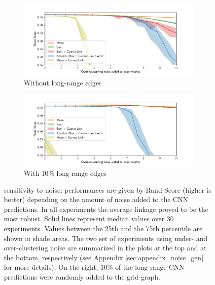 \begin{figure}
        \begin{subfigure}[t]{0.49 \textwidth}
        \centering
        \includegraphics[width=\textwidth,trim=0.55in 0.1in 0.65in 0.2in,clip]{./figs/noise_plots/over_segment_plots_0.pdf}
        \caption{Without long-range edges} \label{fig:merge_noise_only_direct}
    \end{subfigure} \hfill
    \begin{subfigure}[t]{0.49 \textwidth}
        \centering
        \includegraphics[width=\textwidth,trim=0.53in 0.1in 0.65in 0.20in,clip]{./figs/noise_plots/over_segment_plots_1.pdf}
        \caption{With 10\% long-range edges} \label{fig:merge_noise_with_long_range}
    \end{subfigure}
\caption{\algname{} sensitivity to noise: performances are given by Rand-Score (higher is better) depending on the amount of noise added to the CNN predictions. In all experiments the average linkage proved to be the most robust. Solid lines represent median values over 30 experiments. Values between the 25th and the 75th percentile are shown in shade areas. The two set of experiments using under- and over-clustering noise are summarized in the plots at the top and at the bottom, respectively (see Appendix \ref{sec:appendix_noise_gen} for more details). On the right, 10\% of the long-range CNN predictions were randomly added to the grid-graph. 
}\label{fig:noise_plots}
\end{figure}
